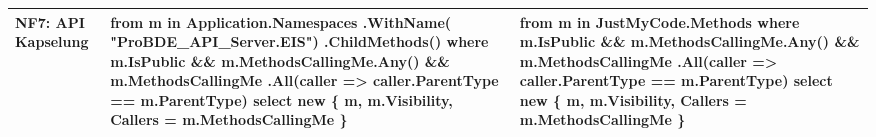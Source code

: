 \begin{longtable}{|>{\raggedright\arraybackslash}p{}|>{\raggedright\arraybackslash}p{}|>{\raggedright\arraybackslash}p{}|}
NF7: API Kapselung &
{\ttfamily
from m in Application.Namespaces\newline
\quad .WithName(\newline
\quad \quad "ProBDE\_API\_Server.EIS")\newline
\quad .ChildMethods()\newline
where m.IsPublic\newline
\quad \&\& m.MethodsCallingMe.Any()\newline
\quad \&\& m.MethodsCallingMe\newline
\quad \quad .All(caller => caller.ParentType \newline
\quad \quad == m.ParentType)\newline
select new \{ m, m.Visibility, \newline
\quad Callers = m.MethodsCallingMe \}
}
&
{\ttfamily
from m in JustMyCode.Methods\newline
where m.IsPublic\newline
\quad \&\& m.MethodsCallingMe.Any()\newline
\quad \&\& m.MethodsCallingMe\newline
\quad \quad .All(caller => caller.ParentType \newline
\quad \quad == m.ParentType)\newline
select new \{ m, m.Visibility, \newline
\quad Callers = m.MethodsCallingMe \}
}
\\ \hline


\end{longtable}
